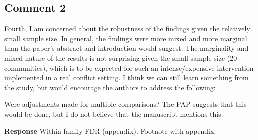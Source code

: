 \documentclass[
]{article}
\begin{document}
\hypertarget{comment-2}{%
\subsection{Comment 2}\label{comment-2}}

Fourth, I am concerned about the robustness of the findings given the
relatively small sample size. In general, the findings were more mixed
and more marginal than the paper's abstract and introduction would
suggest. The marginality and mixed nature of the results is not
surprising given the small sample size (20 communities), which is to be
expected for such an intense/expensive intervention implemented in a
real conflict setting. I think we can still learn something from the
study, but would encourage the authors to address the following:

Were adjustments made for multiple comparisons? The PAP suggests that
this would be done, but I do not believe that the manuscript mentions
this.

\textbf{Response} Within family FDR (appendix). Footnote with appendix.
\end{document}
